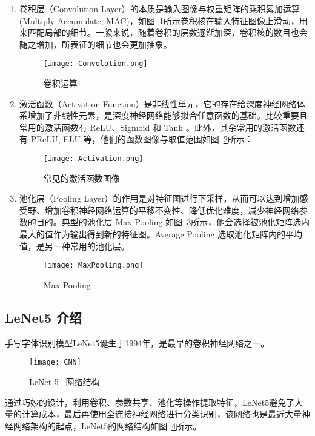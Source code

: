 \begin{enumerate}
    \item 卷积层（Convolution Layer）的本质是输入图像与权重矩阵的乘积累加运算(Multiply Accumulate, MAC)，如图~\ref{fig:Convolution}所示卷积核在输入特征图像上滑动，用来匹配局部的细节。一般来说，随着卷积的层数逐渐加深，卷积核的数目也会随之增加，所表征的细节也会更加抽象。
    \begin{figure}[!htbp]
        \centering
        \texttt{[image: Convolotion.png]}
        \caption{卷积运算}
        \label{fig:Convolution}
    \end{figure}
    \item 激活函数（Activation Function）是非线性单元，它的存在给深度神经网络体系增加了非线性元素，是深度神经网络能够拟合任意函数的基础。比较重要且常用的激活函数有 ReLU、Sigmoid 和 Tanh 。此外，其余常用的激活函数还有 PReLU, ELU 等，他们的函数图像与取值范围如图~\ref{fig:Activation}所示：
    \begin{figure}[!htbp]
        \centering
        \texttt{[image: Activation.png]}
        \caption{常见的激活函数图像}
        \label{fig:Activation}
    \end{figure}
    \item 池化层（Pooling Layer）的作用是对特征图进行下采样，从而可以达到增加感受野、增加卷积神经网络运算的平移不变性、降低优化难度，减少神经网络参数的目的。典型的池化层 Max Pooling 如图~\ref{fig:MaxPooling}所示，他会选择被池化矩阵选内最大的值作为输出得到新的特征图。Average Pooling 选取池化矩阵内的平均值，是另一种常用的池化层。
    \begin{figure}[!htbp]
        \centering
        \texttt{[image: MaxPooling.png]}
        \caption{Max Pooling}
        \label{fig:MaxPooling}
    \end{figure}
\end{enumerate}

\subsection{LeNet5 介绍}

手写字体识别模型LeNet5诞生于1994年，是最早的卷积神经网络之一。

\begin{figure}[!htbp]
    \centering
    \texttt{[image: CNN]}
    \caption{LeNet-5 \ 网络结构}
    \label{fig:CNN}
\end{figure}

通过巧妙的设计，利用卷积、参数共享、池化等操作提取特征，LeNet5避免了大量的计算成本，最后再使用全连接神经网络进行分类识别，该网络也是最近大量神经网络架构的起点，LeNet5的网络结构如图~\ref{fig:CNN}所示。

